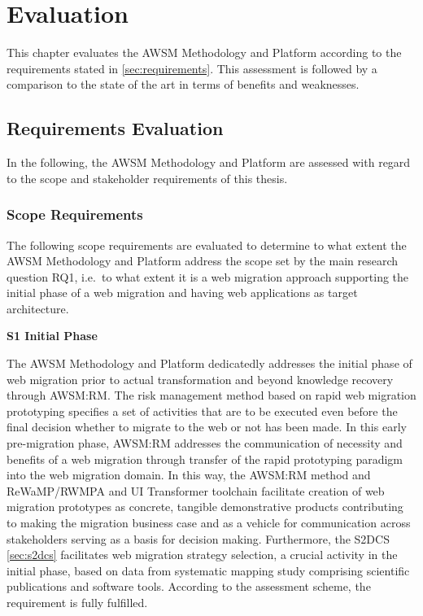 \hypertarget{sec:evaluation}{%
\chapter{Evaluation}\label{sec:evaluation}}

This chapter evaluates the AWSM Methodology and Platform according to the requirements stated in \cref{sec:requirements}.
This assessment is followed by a comparison to the state of the art in terms of benefits and weaknesses.

\hypertarget{requirements-evaluation}{%
\section{Requirements Evaluation}\label{requirements-evaluation}}

In the following, the AWSM Methodology and Platform are assessed with regard to the scope and stakeholder requirements of this thesis.

\hypertarget{scope-requirements}{%
\subsection{Scope Requirements}\label{scope-requirements}}

The following scope requirements are evaluated to determine to what extent the AWSM Methodology and Platform address the scope set by the main research question RQ1, i.e.~to what extent it is a web migration approach supporting the initial phase of a web migration and having web applications as target architecture.

\textbf{S1 Initial Phase}

The AWSM Methodology and Platform dedicatedly addresses the initial phase of web migration prior to actual transformation and beyond knowledge recovery through AWSM:RM.
The risk management method based on rapid web migration prototyping specifies a set of activities that are to be executed even before the final decision whether to migrate to the web or not has been made.
In this early pre-migration phase, AWSM:RM addresses the communication of necessity and benefits of a web migration through transfer of the rapid prototyping paradigm into the web migration domain.
In this way, the AWSM:RM method and ReWaMP/RWMPA and UI Transformer toolchain facilitate creation of web migration prototypes as concrete, tangible demonstrative products contributing to making the migration business case and as a vehicle for communication across stakeholders serving as a basis for decision making.
Furthermore, the S2DCS \cref{sec:s2dcs} facilitates web migration strategy selection, a crucial activity in the initial phase, based on data from systematic mapping study comprising scientific publications and software tools.
According to the assessment scheme, the requirement is fully fulfilled.

